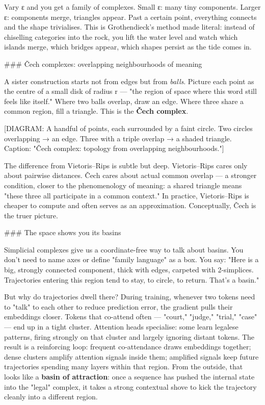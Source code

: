 \documentclass[12pt,a4paper]{article}
\begin{document}
Vary ε and you get a family of complexes. Small ε: many tiny components. Larger ε: components merge, triangles appear. Past a certain point, everything connects and the shape trivialises. This is Grothendieck's method made literal: instead of chiselling categories into the rock, you lift the water level and watch which islands merge, which bridges appear, which shapes persist as the tide comes in.

\#\#\# Čech complexes: overlapping neighbourhoods of meaning

A sister construction starts not from edges but from \textit{balls}. Picture each point as the centre of a small disk of radius r --- "the region of space where this word still feels like itself." Where two balls overlap, draw an edge. Where three share a common region, fill a triangle. This is the \textbf{Čech complex}.

[DIAGRAM: A handful of points, each surrounded by a faint circle. Two circles overlapping → an edge. Three with a triple overlap → a shaded triangle. Caption: "Čech complex: topology from overlapping neighbourhoods."]

The difference from Vietoris–Rips is subtle but deep. Vietoris–Rips cares only about pairwise distances. Čech cares about actual common overlap --- a stronger condition, closer to the phenomenology of meaning: a shared triangle means "these three all participate in a common context." In practice, Vietoris–Rips is cheaper to compute and often serves as an approximation. Conceptually, Čech is the truer picture.

\#\#\# The space shows you its basins

Simplicial complexes give us a coordinate-free way to talk about basins. You don't need to name axes or define "family language" as a box. You say: "Here is a big, strongly connected component, thick with edges, carpeted with 2-simplices. Trajectories entering this region tend to stay, to circle, to return. That's a basin."

But why do trajectories dwell there? During training, whenever two tokens need to "talk" to each other to reduce prediction error, the gradient pulls their embeddings closer. Tokens that co-attend often --- "court," "judge," "trial," "case" --- end up in a tight cluster. Attention heads specialise: some learn legalese patterns, firing strongly on that cluster and largely ignoring distant tokens. The result is a reinforcing loop: frequent co-attendance draws embeddings together; dense clusters amplify attention signals inside them; amplified signals keep future trajectories spending many layers within that region. From the outside, that looks like a \textbf{basin of attraction}: once a sequence has pushed the internal state into the "legal" complex, it takes a strong contextual shove to kick the trajectory cleanly into a different region.
\end{document}
